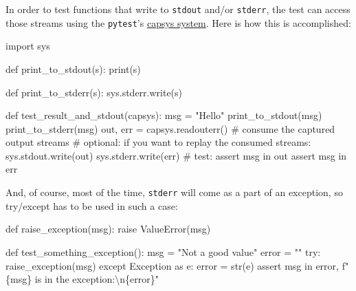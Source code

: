 \documentclass[
]{report}
\newenvironment{Shaded}{\begin{snugshade}}{\end{snugshade}}
\newcommand{\BuiltInTok}[1]{\textcolor[rgb]{0.00,0.23,0.31}{#1}}
\newcommand{\CharTok}[1]{\textcolor[rgb]{0.13,0.47,0.30}{#1}}
\newcommand{\CommentTok}[1]{\textcolor[rgb]{0.37,0.37,0.37}{#1}}
\newcommand{\ControlFlowTok}[1]{\textcolor[rgb]{0.00,0.23,0.31}{#1}}
\newcommand{\ImportTok}[1]{\textcolor[rgb]{0.00,0.46,0.62}{#1}}
\newcommand{\KeywordTok}[1]{\textcolor[rgb]{0.00,0.23,0.31}{#1}}
\newcommand{\NormalTok}[1]{\textcolor[rgb]{0.00,0.23,0.31}{#1}}
\newcommand{\OperatorTok}[1]{\textcolor[rgb]{0.37,0.37,0.37}{#1}}
\newcommand{\PreprocessorTok}[1]{\textcolor[rgb]{0.68,0.00,0.00}{#1}}
\newcommand{\SpecialCharTok}[1]{\textcolor[rgb]{0.37,0.37,0.37}{#1}}
\newcommand{\SpecialStringTok}[1]{\textcolor[rgb]{0.13,0.47,0.30}{#1}}
\newcommand{\StringTok}[1]{\textcolor[rgb]{0.13,0.47,0.30}{#1}}
\begin{document}
In order to test functions that write to \texttt{stdout} and/or
\texttt{stderr}, the test can access those streams using the
\texttt{pytest}'s
\href{https://docs.pytest.org/en/latest/capture.html}{capsys system}.
Here is how this is accomplished:

\begin{Shaded}
\begin{Highlighting}[]
\ImportTok{import}\NormalTok{ sys}


\KeywordTok{def}\NormalTok{ print\_to\_stdout(s):}
    \BuiltInTok{print}\NormalTok{(s)}


\KeywordTok{def}\NormalTok{ print\_to\_stderr(s):}
\NormalTok{    sys.stderr.write(s)}


\KeywordTok{def}\NormalTok{ test\_result\_and\_stdout(capsys):}
\NormalTok{    msg }\OperatorTok{=} \StringTok{"Hello"}
\NormalTok{    print\_to\_stdout(msg)}
\NormalTok{    print\_to\_stderr(msg)}
\NormalTok{    out, err }\OperatorTok{=}\NormalTok{ capsys.readouterr()  }\CommentTok{\# consume the captured output streams}
    \CommentTok{\# optional: if you want to replay the consumed streams:}
\NormalTok{    sys.stdout.write(out)}
\NormalTok{    sys.stderr.write(err)}
    \CommentTok{\# test:}
    \ControlFlowTok{assert}\NormalTok{ msg }\KeywordTok{in}\NormalTok{ out}
    \ControlFlowTok{assert}\NormalTok{ msg }\KeywordTok{in}\NormalTok{ err}
\end{Highlighting}
\end{Shaded}

And, of course, most of the time, \texttt{stderr} will come as a part of
an exception, so try/except has to be used in such a case:

\begin{Shaded}
\begin{Highlighting}[]
\KeywordTok{def}\NormalTok{ raise\_exception(msg):}
    \ControlFlowTok{raise} \PreprocessorTok{ValueError}\NormalTok{(msg)}


\KeywordTok{def}\NormalTok{ test\_something\_exception():}
\NormalTok{    msg }\OperatorTok{=} \StringTok{"Not a good value"}
\NormalTok{    error }\OperatorTok{=} \StringTok{""}
    \ControlFlowTok{try}\NormalTok{:}
\NormalTok{        raise\_exception(msg)}
    \ControlFlowTok{except} \PreprocessorTok{Exception} \ImportTok{as}\NormalTok{ e:}
\NormalTok{        error }\OperatorTok{=} \BuiltInTok{str}\NormalTok{(e)}
        \ControlFlowTok{assert}\NormalTok{ msg }\KeywordTok{in}\NormalTok{ error, }\SpecialStringTok{f"}\SpecialCharTok{\{}\NormalTok{msg}\SpecialCharTok{\}}\SpecialStringTok{ is in the exception:}\CharTok{\textbackslash{}n}\SpecialCharTok{\{}\NormalTok{error}\SpecialCharTok{\}}\SpecialStringTok{"}
\end{Highlighting}
\end{Shaded}
\end{document}
